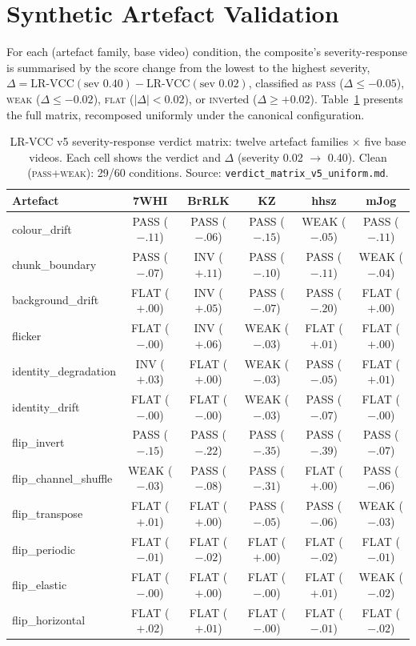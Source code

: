 \section{Synthetic Artefact Validation}
\label{sec:exp:synthetic}

For each (artefact family, base video) condition, the composite's
severity-response is summarised by the score change from the lowest to the
highest severity, $\Delta = \text{LR-VCC}(\text{sev }0.40) -
\text{LR-VCC}(\text{sev }0.02)$, classified as \textsc{pass} ($\Delta \leq
-0.05$), \textsc{weak} ($\Delta \leq -0.02$), \textsc{flat} ($|\Delta| <
0.02$), or \textsc{inv}erted ($\Delta \geq +0.02$). Table~\ref{tab:exp:verdict}
presents the full matrix, recomposed uniformly under the canonical
configuration.

\begin{table}[h]
\centering
\caption{LR-VCC v5 severity-response verdict matrix: twelve artefact families
$\times$ five base videos. Each cell shows the verdict and $\Delta$ (severity
0.02 $\to$ 0.40). Clean (\textsc{pass}+\textsc{weak}): 29/60 conditions.
Source: \texttt{verdict\_matrix\_v5\_uniform.md}.}
\label{tab:exp:verdict}
\small
\setlength{\tabcolsep}{3.5pt}
\begin{tabular}{lccccc}
\hline
\textbf{Artefact} & \textbf{7WHI} & \textbf{BrRLK} & \textbf{KZ} & \textbf{hhsz} & \textbf{mJog} \\
\hline
colour\_drift & PASS ($-.11$) & PASS ($-.06$) & PASS ($-.15$) & WEAK ($-.05$) & PASS ($-.11$) \\
chunk\_boundary & PASS ($-.07$) & INV ($+.11$) & PASS ($-.10$) & PASS ($-.11$) & WEAK ($-.04$) \\
background\_drift & FLAT ($+.00$) & INV ($+.05$) & PASS ($-.07$) & PASS ($-.20$) & FLAT ($+.00$) \\
flicker & FLAT ($-.00$) & INV ($+.06$) & WEAK ($-.03$) & FLAT ($+.01$) & FLAT ($+.00$) \\
identity\_degradation & INV ($+.03$) & FLAT ($+.00$) & WEAK ($-.03$) & PASS ($-.05$) & FLAT ($+.01$) \\
identity\_drift & FLAT ($-.00$) & FLAT ($-.00$) & WEAK ($-.03$) & PASS ($-.07$) & FLAT ($-.00$) \\
\hline
flip\_invert & PASS ($-.15$) & PASS ($-.22$) & PASS ($-.35$) & PASS ($-.39$) & PASS ($-.07$) \\
flip\_channel\_shuffle & WEAK ($-.03$) & PASS ($-.08$) & PASS ($-.31$) & FLAT ($+.00$) & PASS ($-.06$) \\
flip\_transpose & FLAT ($+.01$) & FLAT ($+.00$) & PASS ($-.05$) & PASS ($-.06$) & WEAK ($-.03$) \\
flip\_periodic & FLAT ($-.01$) & FLAT ($-.02$) & FLAT ($+.00$) & FLAT ($-.02$) & FLAT ($-.01$) \\
flip\_elastic & FLAT ($-.00$) & FLAT ($+.00$) & FLAT ($-.00$) & FLAT ($+.01$) & WEAK ($-.02$) \\
flip\_horizontal & FLAT ($+.02$) & FLAT ($+.01$) & FLAT ($-.00$) & FLAT ($-.01$) & FLAT ($-.02$) \\
\hline
\end{tabular}
\end{table}

